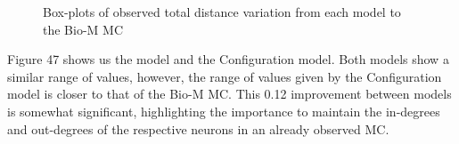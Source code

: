 \begin{figure}[H]%
    \centering
    \captionsetup{justification=centering}
    \qquad
    \caption{Box-plots of observed total distance variation from each model to the Bio-M MC}%
    \label{fig:example}%
\end{figure}
Figure 47 shows us the \ER model and the Configuration model. Both models show a similar range of values, however, the range of values given by the Configuration model is closer to that of the Bio-M MC. This 0.12 improvement between models is somewhat significant, highlighting the importance to maintain the in-degrees and out-degrees of the respective neurons in an already observed MC.

